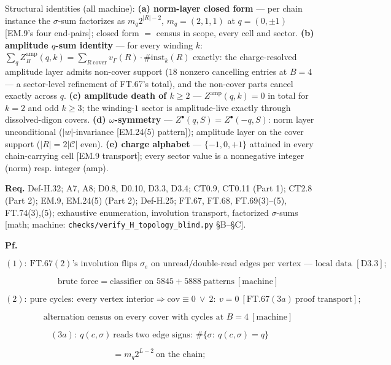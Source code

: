 \begin{theorem}
Structural identities (all machine): \textbf{(a) norm-layer closed form} — per chain instance the $\sigma$-sum factorizes as $m_q2^{|R|-2}$, $m_q=(2,1,1)$ at $q=(0,\pm1)$ [EM.9's four end-pairs]; closed form $=$ census in scope, every cell and sector. \textbf{(b) amplitude $q$-sum identity} — for every winding $k$: $\sum_qZ^{\mathrm{amp}}_B(q,k)=\sum_{R\ \mathrm{cover}}v_\Gamma(R)\cdot\#\mathrm{inst}_k(R)$ exactly: the charge-resolved amplitude layer admits non-cover support ($18$ nonzero cancelling entries at $B=4$ — a sector-level refinement of FT.67's total), and the non-cover parts cancel exactly across $q$. \textbf{(c) amplitude death of $k\ge2$} — $Z^{\mathrm{amp}}(q,k)=0$ in total for $k=2$ and odd $k\ge3$; the winding-$1$ sector is amplitude-live exactly through dissolved-digon covers. \textbf{(d) $\omega$-symmetry} — $Z^{\bullet}(q,S)=Z^{\bullet}(-q,S)$: norm layer unconditional ($|w|$-invariance [EM.24(5) pattern]); amplitude layer on the cover support ($|R|=2|\mathcal C|$ even). \textbf{(e) charge alphabet} — $\{-1,0,+1\}$ attained in every chain-carrying cell [EM.9 transport]; every sector value is a nonnegative integer (norm) resp. integer (amp).

\textbf{Req.} Def-H.32; A7, A8; D0.8, D0.10, D3.3, D3.4; CT0.9, CT0.11 (Part 1); CT2.8 (Part 2); EM.9, EM.24(5) (Part 2); Def-H.25; FT.67, FT.68, FT.69(3)–(5), FT.74(3),(5); exhaustive enumeration, involution transport, factorized $\sigma$-sums [math; machine: \texttt{checks/\allowbreak{}verify\_\allowbreak{}H\_\allowbreak{}topology\_\allowbreak{}blind.py} §B–§C].

\textbf{Pf.}

\[
(1):\ \mathrm{FT.67}(2)\text{'s involution flips }\sigma_e\text{ on unread/double-read edges per vertex — local data }[\mathrm{D3.3}];
\]

\[
\qquad \text{brute force}=\text{classifier on }5845+5888\ \text{patterns}\ [\text{machine}]
\]

\[
(2):\ \text{pure cycles}:\ \text{every vertex interior}\Rightarrow\text{cov}\equiv0\ \vee\ 2:\ v=0\ [\mathrm{FT.67}(3a)\ \text{proof transport}];
\]

\[
\qquad \text{alternation census on every cover with cycles at }B=4\ [\text{machine}]
\]

\[
(3a):\ q(c,\sigma)\ \text{reads two edge signs}:\ \#\{\sigma:\ q(c,\sigma)=q\}
\]

\[
= m_q2^{L-2}\ \text{on the chain};
\]


\end{theorem}
